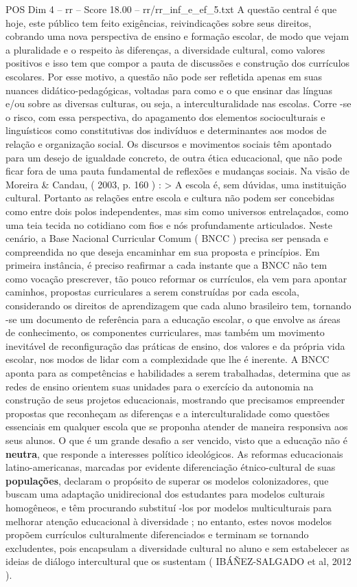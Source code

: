 \begin{textsample}{POS Dim 4 – rr – Score 18.00 – rr/rr\_inf\_e\_ef\_5.txt}
A questão central é que hoje, este público tem feito exigências, reivindicações sobre seus direitos, cobrando uma nova perspectiva de ensino e formação escolar, de modo que vejam a pluralidade e o respeito às diferenças, a diversidade cultural, como valores positivos e isso tem que compor a pauta de discussões e construção dos currículos escolares.
Por esse motivo, a questão não pode ser refletida apenas em suas nuances didático-pedagógicas, voltadas para como e o que ensinar das línguas e/ou sobre as diversas culturas, ou seja, a interculturalidade nas escolas.
Corre -se o risco, com essa perspectiva, do apagamento dos elementos socioculturais e linguísticos como constitutivas dos indivíduos e determinantes aos modos de relação e organização social.
Os discursos e movimentos sociais têm apontado para um desejo de igualdade concreto, de outra ética educacional, que não pode ficar fora de uma pauta fundamental de reflexões e mudanças sociais.
Na visão de Moreira \& Candau, ( 2003, p. 160 ) : > A escola é, sem dúvidas, uma instituição cultural.
Portanto as relações entre escola e cultura não podem ser concebidas como entre dois polos independentes, mas sim como universos entrelaçados, como uma teia tecida no cotidiano com fios e nós profundamente articulados.
Neste cenário, a Base Nacional Curricular Comum ( BNCC ) precisa ser pensada e compreendida no que deseja encaminhar em sua proposta e princípios.
Em primeira instância, é preciso reafirmar a cada instante que a BNCC não tem como vocação prescrever, tão pouco reformar os currículos, ela vem para apontar caminhos, propostas curriculares a serem construídas por cada escola, considerando os direitos de aprendizagem que cada aluno brasileiro tem, tornando -se um documento de referência para a educação escolar, o que envolve as áreas de conhecimento, os componentes curriculares, mas também um movimento inevitável de reconfiguração das práticas de ensino, dos valores e da própria vida escolar, nos modos de lidar com a complexidade que lhe é inerente.
A BNCC aponta para as competências e habilidades a serem trabalhadas, determina que as redes de ensino orientem suas unidades para o exercício da autonomia na construção de seus projetos educacionais, mostrando que precisamos empreender propostas que reconheçam as diferenças e a interculturalidade como questões essenciais em qualquer escola que se proponha atender de maneira responsiva aos seus alunos.
O que é um grande desafio a ser vencido, visto que a educação não é \textbf{neutra}, que responde a interesses político ideológicos.
As reformas educacionais latino-americanas, marcadas por evidente diferenciação étnico-cultural de suas \textbf{populações}, declaram o propósito de superar os modelos colonizadores, que buscam uma adaptação unidirecional dos estudantes para modelos culturais homogêneos, e têm procurando substituí -los por modelos multiculturais para melhorar atenção educacional à diversidade ; no entanto, estes novos modelos propõem currículos culturalmente diferenciados e terminam se tornando excludentes, pois encapsulam a diversidade cultural no aluno e sem estabelecer as ideias de diálogo intercultural que os sustentam ( IBÁÑEZ-SALGADO et al, 2012 ).

\end{textsample}
